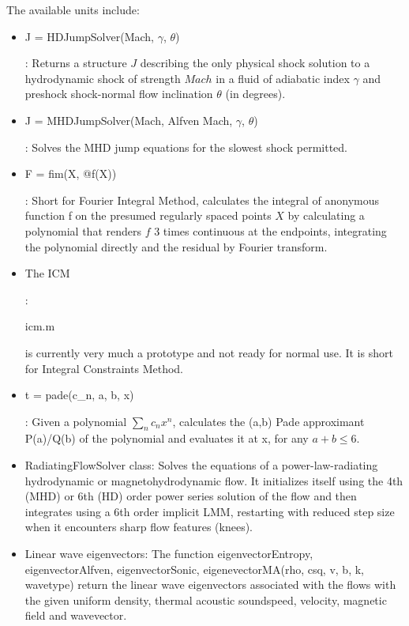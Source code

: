 \documentclass[letterpaper,12pt]{article}
\begin{document}
The available units include:
\begin{itemize}
\item \begin{tt}J = HDJumpSolver(Mach, $\gamma$, $\theta$)\end{tt}: Returns a structure $J$ describing the
only physical shock solution to a hydrodynamic shock of strength $Mach$ in a fluid of
adiabatic index $\gamma$ and preshock shock-normal flow inclination $\theta$ (in degrees).
\item \begin{tt}J = MHDJumpSolver(Mach, Alfven Mach, $\gamma$, $\theta$)\end{tt}: Solves the MHD jump
equations for the slowest shock permitted.
\item \begin{tt}F = fim(X, @f(X))\end{tt}: Short for Fourier Integral Method, calculates the integral of
anonymous function f on the presumed regularly spaced points $X$ by calculating a polynomial
that renders $f$ 3 times continuous at the endpoints, integrating the polynomial directly
and the residual by Fourier transform.
\item \begin{tt}The ICM\end{tt}: \begin{tt}icm.m\end{tt} is currently very much a prototype and not ready for normal use.
It is short for Integral Constraints Method.
\item \begin{tt}t = pade(c\_n, a, b, x)\end{tt}: Given a polynomial $\sum_n c_n x^n$, calculates the (a,b)
Pade approximant P(a)/Q(b) of the polynomial and evaluates it at x, for any $a+b \le 6$.
\item RadiatingFlowSolver class: Solves the equations of a power-law-radiating hydrodynamic
or magnetohydrodynamic flow. It initializes itself using the 4th (MHD) or 6th (HD) order power
series solution of the flow and then integrates using a 6th order implicit LMM, restarting with
reduced step size when it encounters sharp flow features (knees).
\item Linear wave eigenvectors: The function eigenvectorEntropy, eigenvectorAlfven, eigenvectorSonic,
eigenevectorMA(rho, csq, v, b, k, wavetype) return the linear wave eigenvectors associated with the
flows with the given uniform density, thermal acoustic soundspeed, velocity, magnetic field and wavevector.

\end{itemize}
\end{document}
